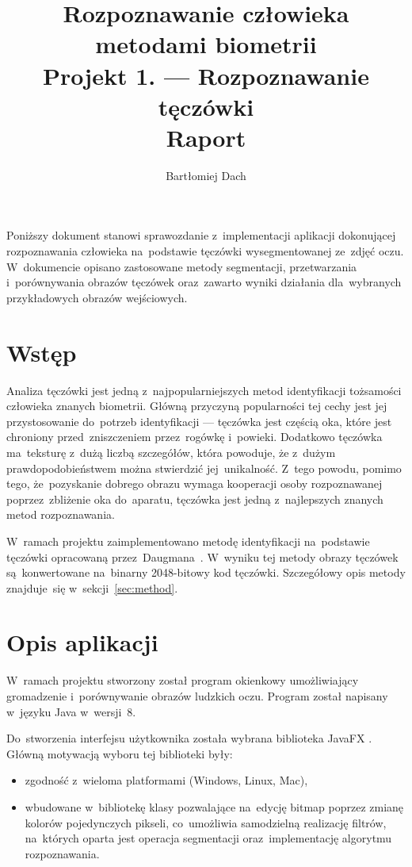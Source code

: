\documentclass[11pt,a4paper]{article}
\begin{document}
\title{Rozpoznawanie człowieka metodami biometrii \\
\Large{
    Projekt 1. --- Rozpoznawanie tęczówki \\
    Raport
}}
\author{Bartłomiej Dach}
\maketitle

Poniższy dokument stanowi sprawozdanie z~implementacji aplikacji dokonującej rozpoznawania człowieka na~podstawie tęczówki wysegmentowanej ze~zdjęć oczu.
W~dokumencie opisano zastosowane metody segmentacji, przetwarzania i~porównywania obrazów tęczówek oraz~zawarto wyniki działania dla~wybranych przykładowych obrazów wejściowych.

\section{Wstęp}

Analiza tęczówki jest jedną z~najpopularniejszych metod identyfikacji tożsamości człowieka znanych biometrii.
Główną przyczyną popularności tej cechy jest jej przystosowanie do~potrzeb identyfikacji --- tęczówka jest częścią oka, które jest chroniony przed~zniszczeniem przez~rogówkę i~powieki.
Dodatkowo tęczówka ma~teksturę z~dużą liczbą szczegółów, która powoduje, że z~dużym prawdopodobieństwem można stwierdzić jej~unikalność.
Z~tego powodu, pomimo tego, że~pozyskanie dobrego obrazu wymaga kooperacji osoby rozpoznawanej poprzez~zbliżenie oka do~aparatu, tęczówka jest jedną z~najlepszych znanych metod rozpoznawania.

W~ramach projektu zaimplementowano metodę identyfikacji na~podstawie tęczówki opracowaną przez~Daugmana~\cite{daugman2004, slot2008}.
W~wyniku tej metody obrazy tęczówek są~konwertowane na~binarny 2048-bitowy kod tęczówki.
Szczegółowy opis metody znajduje~się w~sekcji~\ref{sec:method}.

\section{Opis aplikacji}

W~ramach projektu stworzony został program okienkowy umożliwiający gromadzenie i~porównywanie obrazów ludzkich oczu.
Program został napisany w~języku Java w~wersji~8.

Do~stworzenia interfejsu użytkownika została wybrana biblioteka JavaFX \cite{javafx}.
Główną motywacją wyboru tej biblioteki były:
\begin{itemize}
    \item zgodność z~wieloma platformami (Windows, Linux, Mac),
    \item wbudowane w~bibliotekę klasy pozwalające na~edycję bitmap poprzez zmianę kolorów pojedynczych pikseli, co~umożliwia samodzielną realizację filtrów, na~których oparta jest operacja segmentacji oraz~implementację algorytmu rozpoznawania.
\end{itemize}
\end{document}
